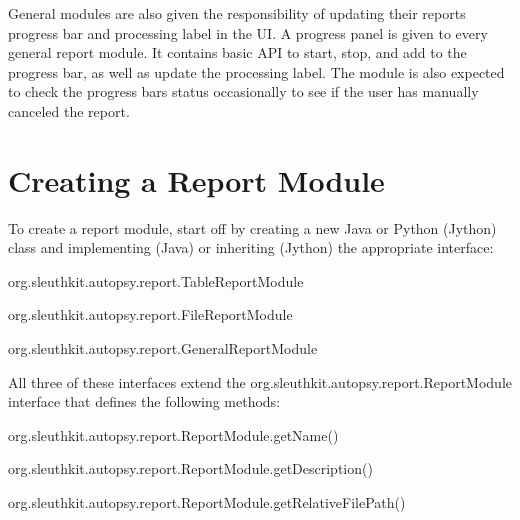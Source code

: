 General modules are also given the responsibility of updating their report\textquotesingle{}s progress bar and processing label in the UI. A progress panel is given to every general report module. It contains basic A\+PI to start, stop, and add to the progress bar, as well as update the processing label. The module is also expected to check the progress bar\textquotesingle{}s status occasionally to see if the user has manually canceled the report.\hypertarget{mod_report_page_report_create_module}{}\section{Creating a Report Module}\label{mod_report_page_report_create_module}
To create a report module, start off by creating a new Java or Python (Jython) class and implementing (Java) or inheriting (Jython) the appropriate interface\+:
\begin{DoxyItemize}
\item org.\+sleuthkit.\+autopsy.\+report.\+Table\+Report\+Module
\item org.\+sleuthkit.\+autopsy.\+report.\+File\+Report\+Module
\item org.\+sleuthkit.\+autopsy.\+report.\+General\+Report\+Module
\end{DoxyItemize}

All three of these interfaces extend the org.\+sleuthkit.\+autopsy.\+report.\+Report\+Module interface that defines the following methods\+:
\begin{DoxyItemize}
\item org.\+sleuthkit.\+autopsy.\+report.\+Report\+Module.\+get\+Name()
\item org.\+sleuthkit.\+autopsy.\+report.\+Report\+Module.\+get\+Description()
\item org.\+sleuthkit.\+autopsy.\+report.\+Report\+Module.\+get\+Relative\+File\+Path()
\end{DoxyItemize}

